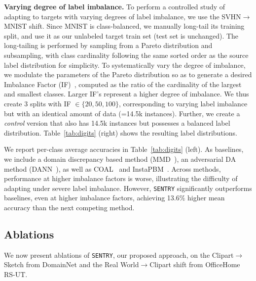 \documentclass[10pt,twocolumn,letterpaper]{article}
\newcommand{\method}{\texttt{SENTRY}\xspace}
\begin{document}
\noindent \textbf{Varying degree of label imbalance.} To perform a controlled study of adapting to targets with varying degrees of label imbalance, we use the SVHN$\rightarrow$MNIST shift. Since MNIST is class-balanced, we manually long-tail its training split, and use it as our unlabeled target train set (test set is unchanged). The long-tailing is performed by sampling from a Pareto distribution and subsampling, with class cardinality following the same sorted order as the source label distribution for simplicity. To systematically vary the degree of imbalance, we modulate the parameters of the Pareto distribution so as to generate a desired Imbalance Factor (IF)~\cite{cui2019class}, computed as the ratio of the cardinality of the largest and smallest classes. Larger IF's represent a higher degree of imbalance. We thus create 3 splits with IF $\in \{20, 50, 100\}$, corresponding to varying label imbalance but with an identical amount of data (=14.5k instances). Further, we create a \emph{control} version that also has 14.5k instances but possesses a balanced label distribution. Table~\ref{tab:digits} (right) shows the resulting label distributions.

We report per-class average accuracies in Table~\ref{tab:digits} (left). As baselines, we include a domain discrepancy based method (MMD~\cite{long2013transfer}), an adversarial DA method (DANN~\cite{ganin2014unsupervised}), as well as COAL~\cite{tan2019generalized} and InstaPBM~\cite{li2020rethinking}.
Across methods, performance at higher imbalance factors is worse, illustrating the difficulty of adapting under severe label imbalance. However, \method significantly outperforms baselines, even at higher imbalance factors, achieving 13.6\% higher mean accuracy than the next competing method. 

\vspace{-5pt}
\subsection{Ablations}
\label{ref:ablations}

\noindent We now present ablations of \method, our proposed approach, on the Clipart$\rightarrow$Sketch from DomainNet and the Real World$\rightarrow$Clipart shift from OfficeHome RS-UT.
\end{document}
